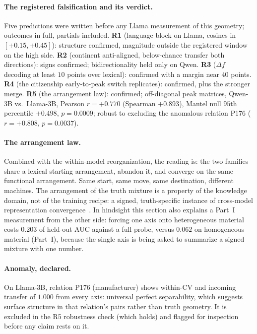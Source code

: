 \documentclass[11pt]{article}
\begin{document}
\paragraph{The registered falsification and its verdict.} Five predictions
were written before any Llama measurement of this geometry; outcomes in
full, partials included. \textbf{R1} (language block on Llama, cosines in
$[+0.15, +0.45]$): structure confirmed, magnitude outside the registered
window on the high side. \textbf{R2} (continent anti-aligned, below-chance
transfer both directions): signs confirmed; bidirectionality held only on
Qwen. \textbf{R3} ($\Delta f$ decoding at least $10$ points over lexical):
confirmed with a margin near $40$ points. \textbf{R4} (the citizenship
early-to-peak switch replicates): confirmed, plus the stronger merge.
\textbf{R5} (the arrangement law): confirmed; off-diagonal peak matrices,
Qwen-3B vs.\ Llama-3B, Pearson $r = +0.770$ (Spearman $+0.893$), Mantel
null $95$th percentile $+0.498$, $p = 0.0009$; robust to excluding the
anomalous relation P176 ($r = +0.808$, $p = 0.0037$).

\paragraph{The arrangement law.} Combined with the within-model
reorganization, the reading is: the two families share a lexical starting
arrangement, abandon it, and converge on the same functional arrangement.
Same start, same move, same destination, different machines. The
arrangement of the truth mixture is a property of the knowledge domain, not
of the training recipe: a signed, truth-specific instance of cross-model
representation convergence~\cite{platonic2024}. In hindsight this section
also explains a Part~I measurement from the other side: forcing
one axis onto heterogeneous material costs $0.203$ of held-out AUC against
a full probe, versus $0.062$ on homogeneous material (Part~I),
because the single axis is being asked to summarize a signed mixture with
one number.

\paragraph{Anomaly, declared.} On Llama-3B, relation P176 (manufacturer)
shows within-CV and incoming transfer of $1.000$ from every axis:
universal perfect separability, which suggests surface structure in that
relation's pairs rather than truth geometry. It is excluded in the R5
robustness check (which holds) and flagged for inspection before any claim
rests on it.
\end{document}

